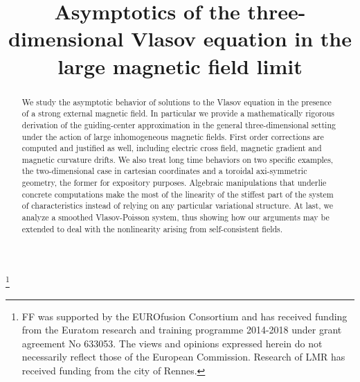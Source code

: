\documentclass[JEP,XML,SOM,Unicode]{cedram}
\theoremstyle{plain}
\theoremstyle{definition}
\begin{document}
\title[The Vlasov equation with strong magnetic field]{Asymptotics of the three-dimensional Vlasov equation in the large magnetic field limit}

\author[\initial{F.} \lastname{Filbet}]{ }
\address{Université de Toulouse III \& IUF, UMR5219, Institut de Mathématiques de Toulouse\\
118, route de Narbonne, F-31062 Toulouse Cedex, France}

\author[\initial{L. M.} \lastname{Rodrigues}]{ }
\address{Univ Rennes \& IUF, CNRS, IRMAR - UMR 6625\\
F-35000 Rennes, France}

\thanks{FF was supported by the EUROfusion Consortium and has received funding from the Euratom research and training programme 2014-2018 under grant agreement No 633053. The views and opinions expressed herein do not necessarily reflect those of the European Commission. Research of LMR has received funding from the city of Rennes.}

\begin{abstract}
We study the asymptotic behavior of solutions to the Vlasov equation in the presence of a strong external magnetic field. In particular we provide a mathematically rigorous derivation of the guiding-center approximation in the general three-dimensional setting under the action of large inhomogeneous magnetic fields. First order corrections are computed and justified as well, including electric cross field, magnetic gradient and magnetic curvature drifts. We also treat long time behaviors on two specific examples, the two-dimensional case in cartesian coordinates and a toroidal axi-symmetric geometry, the former for expository purposes. Algebraic manipulations that underlie concrete computations make the most of the linearity of the stiffest part of the system of characteristics instead of relying on any particular variational structure. At last, we analyze a smoothed Vlasov-Poisson system, thus showing how our arguments may be extended to deal with the nonlinearity arising from self-consistent fields.
\end{abstract}

\end{document}
